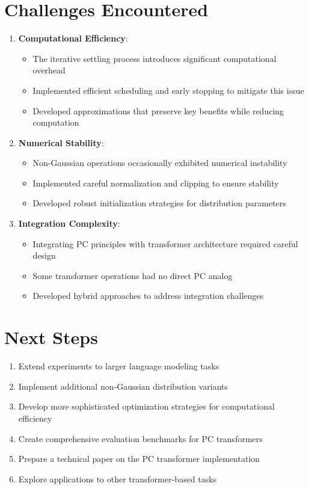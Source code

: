 \documentclass{article}
\begin{document}
\section{Challenges Encountered}

\begin{enumerate}
  \item \textbf{Computational Efficiency}:
  \begin{itemize}
    \item The iterative settling process introduces significant computational overhead
    \item Implemented efficient scheduling and early stopping to mitigate this issue
    \item Developed approximations that preserve key benefits while reducing computation
  \end{itemize}

  \item \textbf{Numerical Stability}:
  \begin{itemize}
    \item Non-Gaussian operations occasionally exhibited numerical instability
    \item Implemented careful normalization and clipping to ensure stability
    \item Developed robust initialization strategies for distribution parameters
  \end{itemize}

  \item \textbf{Integration Complexity}:
  \begin{itemize}
    \item Integrating PC principles with transformer architecture required careful design
    \item Some transformer operations had no direct PC analog
    \item Developed hybrid approaches to address integration challenges
  \end{itemize}
\end{enumerate}

\section{Next Steps}

\begin{enumerate}
  \item Extend experiments to larger language modeling tasks
  \item Implement additional non-Gaussian distribution variants
  \item Develop more sophisticated optimization strategies for computational efficiency
  \item Create comprehensive evaluation benchmarks for PC transformers
  \item Prepare a technical paper on the PC transformer implementation
  \item Explore applications to other transformer-based tasks
\end{enumerate}
\end{document}
